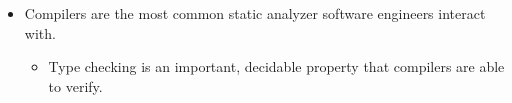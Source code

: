 \documentclass{article}
\begin{document}
\begin{itemize}
	\begin{itemize}
		\item So, said property of a system cannot be guaranteed after verification.
		\item Many other properties, however, can be decided.
		\begin{itemize}
			\item Or, the approximations of the property may be decidable.
		\end{itemize}
	\end{itemize}
	\item Compilers are the most common static analyzer software engineers interact with.
	\begin{itemize}
		\item Type checking is an important, decidable property that compilers are able to verify.
	\end{itemize}
	
\end{itemize}

\ifdefined\iscombined
	\newpage
\else
	
\end{document}
